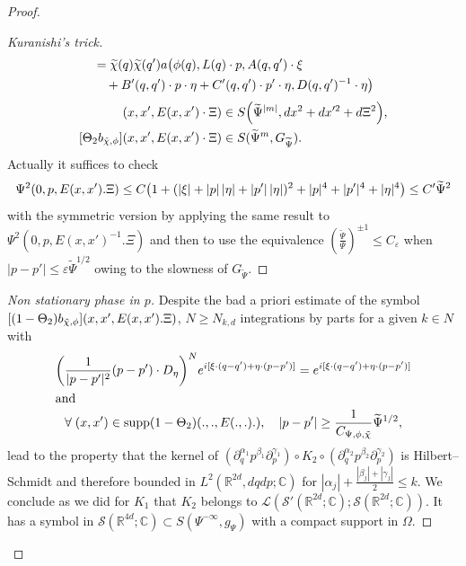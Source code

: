 \documentclass[AHL,Unicode,longabstracts]{cedram}
\newcommand{\C}{\mathbb{C}}
\newcommand{\R}{\mathbb{R}}
\newcommand{\clS}{\mathcal{S}}
\newcommand{\clL}{\mathcal{L}}
\DeclareMathOperator{\suppp}{supp}
\let\oldtilde\tilde
\renewcommand*{\tilde}[1]{\mathchoice{\widetilde{#1}}{\widetilde{#1}}{\oldtilde{#1}}{\oldtilde{#1}}}
\let\oldforall\forall
\renewcommand*{\forall}{\mathrel{\oldforall}}
\let\originalleft\left
\let\originalright\right
\renewcommand{\left}{\mathopen{}\mathclose\bgroup\originalleft}
\renewcommand{\right}{\aftergroup\egroup\originalright}
\begin{document}
\begin{proof}
\begin{proof}[{Kuranishi's trick}]
\begin{align*}
&=\tilde\chi(q)\tilde\chi(q')a\bigl(\phi(q),L(q)\cdot p,A(q,q')\cdot\xi\\
&\quad+B'(q,q')\cdot p\cdot\eta
+C'(q,q')\cdot p'\cdot\eta,D(q,q')^{-1}
\cdot\eta\bigr)
\end{align*}
\begin{align*}
[(1-\Theta_{2})b_{\tilde\chi,\phi}](x,x',E(x,x')\cdot\Xi)&\in S\left(\widetilde{\Psi}^{|m|},dx^{2}+dx'^{2}+d\Xi^{2}\right),\\
[\Theta_{2}b_{\tilde\chi,\phi}](x,x',E(x,x')\cdot\Xi)&\in S(\widetilde{\Psi}^{m},G_{\widetilde{\Psi}}).
\end{align*}
Actually it suffices to check
\[
\Psi^{2}(0,p,E(x,x').\Xi)\leq C\left(1+(|\xi|+|p|\,|\eta|+|p'|\,|\eta|)^{2}+|p|^{4}+|p'|^{4}+|\eta|^{4}\right)\leq C'\widetilde{\Psi}^{2}
\]
with the symmetric version by applying the same result to $\Psi^{2}(0,p,E(x,x')^{-1}.\Xi)$ and then to use the equivalence $(\frac{\widetilde{\Psi}}{\Psi})^{\pm 1}\leq C_{\varepsilon}$ when $|p-p'|\leq \varepsilon \widetilde{\Psi}^{1/2}$ owing to the slowness of $G_{\widetilde{\Psi}}$.
\let\qed\relax
\end{proof}


\begin{proof}[{Non stationary phase in $p$}]
Despite the bad a priori estimate of the symbol $[(1-\Theta_{2})b_{\tilde\chi,\phi}](x,x',E(x,x').\Xi)$, $N\geq N_{k,d}$ integrations by parts for a given $k\in N$ with
\begin{gather*}
\left(\frac{1}{|p-p'|^{2}}(p-p')\cdot D_{\eta}\right)^{N}e^{i[\xi\cdot(q-q')+\eta\cdot(p-p')]}= e^{i[\xi\cdot(q-q')+\eta\cdot(p-p')]}\\
\intertext{and}
\forall (x,x')\in \suppp(1-\Theta_{2})(.,.,E(.,.).),\quad |p-p'|\geq \frac{1}{C_{\Psi,\phi,\tilde\chi}}\widetilde{\Psi}^{1/2},
\end{gather*}
lead to the property that the kernel of $(\partial_{q}^{\alpha_{1}}p^{\beta_{1}}\partial_{p}^{\gamma_{1}})\circ K_{2}\circ(\partial_{q}^{\alpha_{2}}p^{\beta_{2}}\partial_{p}^{\gamma_{2}})$ is Hilbert--Schmidt and therefore bounded in $L^{2}(\R^{2d},dqdp;\C)$ for $|\alpha_{j}|+\frac{|\beta_{j}|+|\gamma_{j}|}{2}\leq k$. We conclude as we did for $K_{1}$ that $K_{2}$ belongs to $\clL(\clS'(\R^{2d};\C);\clS(\R^{2d};\C))$. It has a symbol in $\clS(\R^{4d};\C)\subset S(\Psi^{-\infty},g_{\Psi})$ with a compact support in $\Omega$.
\let\qed\relax
\end{proof}


\end{proof}
\end{document}
